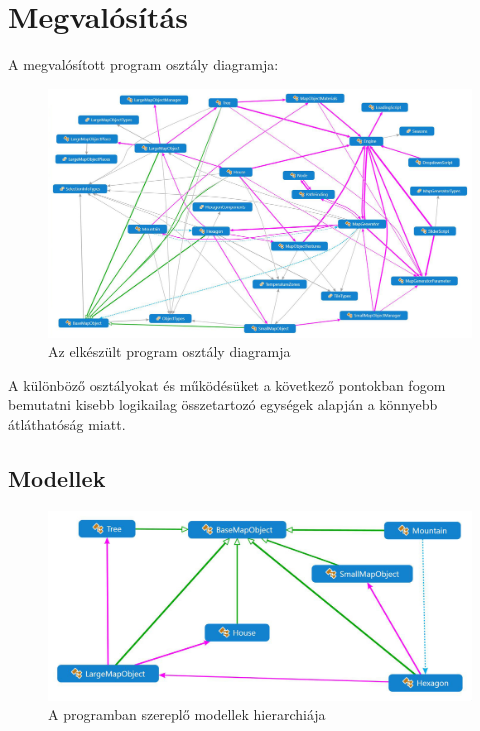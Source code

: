 \chapter{Megvalósítás}

A megvalósított program osztály diagramja:

\begin{figure}[h!]
\centering
\includegraphics[scale=0.3]{kepek/White_Monster.JPG}
\caption{Az elkészült program osztály diagramja}
\label{fig:szorny}
\end{figure}

\noindent A különböző osztályokat és működésüket a következő pontokban fogom bemutatni kisebb logikailag összetartozó egységek alapján a könnyebb átláthatóság miatt. 

\section{Modellek}

\begin{figure}[h!]
\centering
\includegraphics[scale=0.4]{kepek/White_modellek.JPG}
\caption{A programban szereplő modellek hierarchiája}
\label{fig:modellek}
\end{figure}

